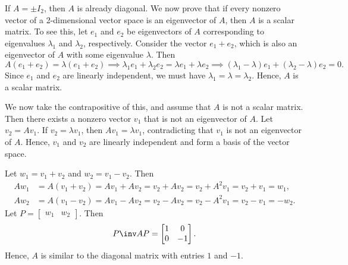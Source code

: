 \begin{sol}
    If $A = \pm I_2$, then $A$ is already diagonal. We now prove that if every nonzero vector of a 2-dimensional vector space is an eigenvector of $A$, then $A$ is a scalar matrix. To see this, let $e_1$ and $e_2$ be eigenvectors of $A$ corresponding to eigenvalues $\lambda_1$ and $\lambda_2$, respectively. Consider the vector $e_1 + e_2$, which is also an eigenvector of $A$ with some eigenvalue $\lambda$. Then
    \[
    A(e_1 + e_2) = \lambda (e_1 + e_2) \implies \lambda_1 e_1 + \lambda_2 e_2 = \lambda e_1 + \lambda e_2 \implies (\lambda_1 - \lambda) e_1 + (\lambda_2 - \lambda) e_2 = 0.
    \]
    Since $e_1$ and $e_2$ are linearly independent, we must have $\lambda_1 = \lambda = \lambda_2$. Hence, $A$ is a scalar matrix.

    We now take the contrapositive of this, and assume that $A$ is not a scalar matrix. Then there exists a nonzero vector $v_1$ that is not an eigenvector of $A$. Let $v_2 = Av_1$. If $v_2 = \lambda v_1$, then $Av_1 = \lambda v_1$, contradicting that $v_1$ is not an eigenvector of $A$. Hence, $v_1$ and $v_2$ are linearly independent and form a basis of the vector space.

    Let $w_1 = v_1 + v_2$ and $w_2 = v_1 - v_2$. Then
    \begin{align*}
        Aw_1 & = A(v_1 + v_2) = Av_1 + Av_2 = v_2 + A v_2 = v_2 + A^2 v_1 = v_2 + v_1 = w_1, \\
        Aw_2 & = A(v_1 - v_2) = Av_1 - Av_2 = v_2 - A v_2 = v_2 - A^2 v_1 = v_2 - v_1 = -w_2.
    \end{align*}
    Let $P = \begin{bmatrix} w_1 & w_2 \end{bmatrix}$. Then
    \[P\inv AP = 
    \begin{bmatrix}
        1 & 0 \\
        0 & -1
    \end{bmatrix}.\]
    Hence, $A$ is similar to the diagonal matrix with entries $1$ and $-1$. 


\end{sol}
